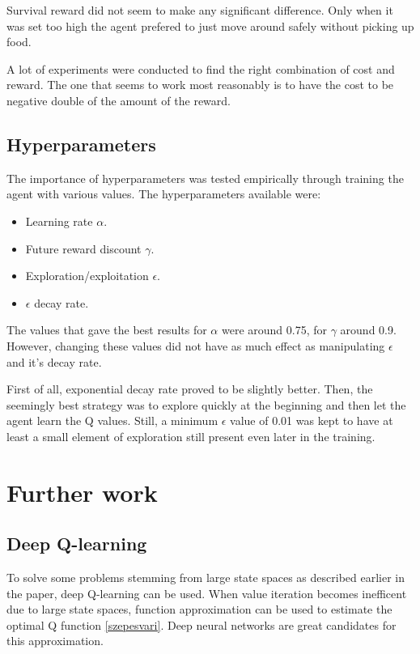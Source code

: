 \documentclass[lettersize,journal]{IEEEtran}
\begin{document}
Survival reward did not seem to make any significant difference.
Only when it was set too high the agent prefered to just move
around safely without picking up food.

A lot of experiments were conducted to find the right combination
of cost and reward. The one that seems to work most reasonably
is to have the cost to be negative double of the amount of the reward.

\subsection{Hyperparameters}
The importance of hyperparameters was tested empirically through
training the agent with various values.
The hyperparameters available were:
\begin{itemize}
    \item Learning rate $\alpha$.
    \item Future reward discount $\gamma$.
    \item Exploration/exploitation $\epsilon$.
    \item $\epsilon$ decay rate.
\end{itemize}

The values that gave the best results for $\alpha$ were around 0.75, for $\gamma$ around 0.9. However, changing these values did not
have as much effect as manipulating $\epsilon$ and it's decay rate.

First of all, exponential decay rate proved to be slightly better.
Then, the seemingly best strategy was to explore quickly at the
beginning and then let the agent learn the Q values. Still, a
minimum $\epsilon$ value of 0.01 was kept to have at least
a small element of exploration still present even later in
the training.

\section{Further work}
\subsection{Deep Q-learning}
To solve some problems stemming from large state spaces as described earlier in
the paper, deep Q-learning can be used. When value iteration becomes
inefficent due to large state spaces, function approximation can be used
to estimate the optimal Q function \ref{szepesvari}. Deep neural networks
are great candidates for this approximation.
\end{document}
